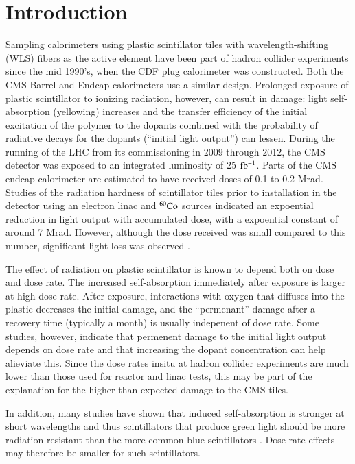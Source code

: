 \documentclass[review]{elsarticle}
\begin{document}
\section{Introduction}
Sampling calorimeters using plastic scintillator tiles
with wavelength-shifting (WLS) fibers as the active element
have been part of hadron
collider experiments since the mid 1990's, when the CDF plug
calorimeter was constructed\cite{Aota1995557}.  Both the CMS
Barrel\cite{CMSHB} and Endcap\cite{HCALTDR1997} calorimeters use a similar design.
Prolonged exposure of plastic scintillator to
ionizing radiation, however, can result in damage:
light self-absorption (yellowing) increases and
the transfer efficiency of the initial excitation of the polymer to the
dopants combined with the probability of radiative decays for the dopants (``initial light output'') can lessen.  
During the running of the LHC from its commissioning in 2009
through 2012, the CMS
detector was exposed to an integrated luminosity of 25 ${\rm fb^{-1}}$.  Parts of the
CMS endcap calorimeter are estimated to have received doses of 0.1 to 0.2 Mrad\cite{ecfa2015}.
Studies of the radiation hardness of scintillator tiles
prior to installation in the detector
using an electron linac and ${\rm ^{60}Co}$ sources
indicated an expoential reduction in 
light output with accumulated dose, with a expoential constant of 
around 7 Mrad\cite{vasken,ByonWagner1993263}.  
However, although the dose received was
small compared to this number,
significant light loss was observed \cite{phaseiitdr}.


The effect of radiation on plastic scintillator is known to depend
both on dose and dose rate\cite{sauli,34504,Wick1991472,289295,173180,173178,Giokaris1993315}.  The increased self-absorption immediately after exposure is larger at high dose rate. After exposure, interactions 
with oxygen that diffuses into
the plastic decreases the initial damage, and the ``permenant'' damage after
a recovery time (typically a month) is usually indepenent of dose rate.  Some studies, 
however, indicate that permenent damage to the initial light output depends
on dose rate\cite{Biagtan1996125} and that increasing the dopant concentration
can help alieviate this\cite{zorn3,sauli}.  Since the dose rates
insitu at hadron collider experiments are much lower than those
used for reactor and linac tests, this may be part of the explanation
for the higher-than-expected damage to the CMS tiles.

In addition, many studies have shown that induced self-absorption is stronger at short wavelengths and thus scintillators that produce green light should
be more radiation resistant than the more common blue scintillators
\cite{Bross199135,sauli,Giokaris1993315}.  Dose rate effects may
therefore be smaller for such scintillators.
\end{document}
